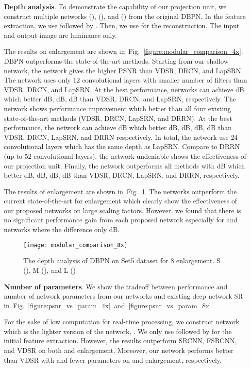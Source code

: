 \documentclass[10pt,twocolumn,letterpaper]{article}
\begin{document}
\textbf{Depth analysis}. To demonstrate the capability of our projection unit, we construct multiple networks  (),  (), and  () from the original DBPN. In the feature extraction, we use  followed by . Then, we use  for the reconstruction. The input and output image are luminance only. 

The results on  enlargement are shown in~Fig.~\ref{figure:modular_comparison_4x}. DBPN outperforms the state-of-the-art methods. Starting from our shallow network, the  network gives the higher PSNR than VDSR, DRCN, and LapSRN. The  network uses only 12 convolutional layers with smaller number of filters than VDSR, DRCN, and LapSRN. At the best performance,  networks can achieve  dB which better  dB,  dB,  dB than VDSR, DRCN, and LapSRN, respectively. The  network shows performance improvement which better than all four existing state-of-the-art methods (VDSR, DRCN, LapSRN, and DRRN). At the best performance, the  network can achieve  dB which better  dB,  dB,  dB,  dB than VDSR, DRCN, LapSRN, and DRRN respectively. In total, the  network use 24 convolutional layers which has the same depth as LapSRN. Compare to DRRN (up to 52 convolutional layers), the  network undeniable shows the effectiveness of our projection unit. Finally, the  network outperforms all methods with  dB which better  dB,  dB,  dB,  dB than VDSR, DRCN, LapSRN, and DRRN, respectively.

The results of  enlargement are shown in~Fig.~\ref{figure:modular_comparison_8x}. The  networks outperform the current state-of-the-art for  enlargement which clearly show the effectiveness of our proposed networks on large scaling factors. However, we found that there is no significant performance gain from each proposed network especially for  and  networks where the difference only  dB. 
\begin{figure}[t]
\centering
\texttt{[image: modular\_comparison\_8x]}
\caption{The depth analysis of DBPN on Set5 dataset for 8 enlargement. S (), M (), and L ()}
\label{figure:modular_comparison_8x}
\end{figure} 



\textbf{Number of parameters}. 
We show the tradeoff between performance
and number of network parameters from our networks and existing deep
network SR in~Fig.~\ref{figure:psnr_vs_param_4x}~and~\ref{figure:psnr_vs_param_8x}. 

For the sake of low computation for real-time processing, we construct  network which is the lighter version of the  network, . We only use  followed by  for the initial feature extraction. However, the results outperform SRCNN, FSRCNN, and VDSR on both  and  enlargement. Moreover, our  network performs better than VDSR with  and  fewer parameters on  and  enlargement, respectively. 
\end{document}
